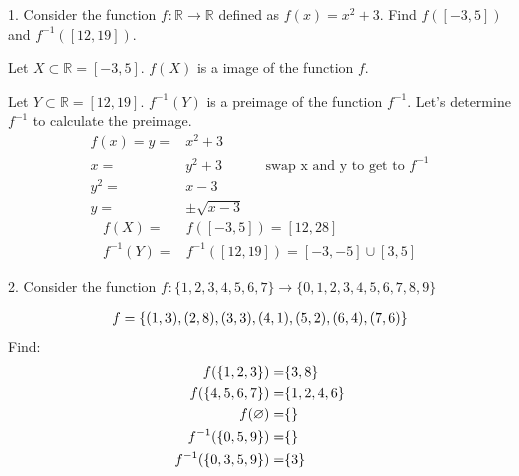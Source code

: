 \documentclass{idrisMemo}
\begin{document}
\toc
\thispagestyle{styleTOC}
\pagebreak
\pagestyle{styleE}

\begin{prooflist}{1. Consider the function $f: \mathbb{R} \rightarrow \mathbb{R}$ defined as $f(x)=x^2+3$. Find $f([-3,5])$ and $f^{-1}([12,19])$.}
\item \imagedef{}
\item Let $X\subset \mathbb{R}= [-3,5]$. $f(X)$ is a image of the function $f$.
\item Let $Y\subset \mathbb{R}= [12,19]$. $f^{-1}(Y)$ is a preimage of the
    function $f^{-1}$.
Let's determine $f^{-1}$ to calculate the preimage.
\begin{align*}
    f(x) = y =& x^2+3\\
    x=&y^2+3&&\text{swap x and y to get to }f^{-1}\\
    y^2=&x-3\\
    y=&\pm\sqrt{x-3}
\end{align*}
\begin{align*}
    f(X) =& f([-3, 5]) = [12, 28]\\
    f^{-1}(Y) =& f^{-1}([12, 19]) = [-3, -5] \cup [3, 5]
\end{align*}
\end{prooflist}


\begin{prooflist}{2. Consider the function $f:\{1,2,3,4,5,6,7\} \rightarrow\{0,1,2,3,4,5,6,7,8,9\}$ }
\item \imagedef{}
\begin{align*}
f=\{(1,3),(2,8),(3,3),(4,1),(5,2),(6,4),(7,6)\}
\end{align*}
Find:
\begin{align*}
    f(\{1,2,3\})=& \{3, 8\} \\
    f(\{4,5,6,7\}) =& \{1, 2, 4, 6\}\\
    f(\varnothing) =& \{\} \\
    f^{-1}(\{0,5,9\}) =& \{\}\\
    f^{-1}(\{0,3,5,9\}) =& \{3\}\\
\end{align*}
\end{prooflist}
\end{document}
